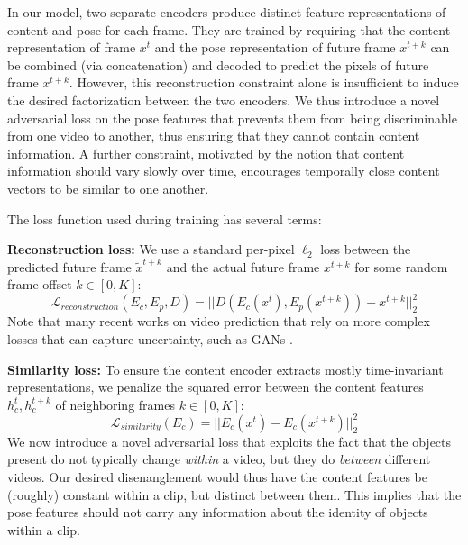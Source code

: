 \documentclass{article}
\begin{document}
In our model, two separate encoders produce distinct feature representations of content and pose for each frame. They are trained by requiring that the content representation of frame $x^t$ and the pose representation of future frame $x^{t+k}$ can be combined (via concatenation) and decoded to predict the pixels of future frame $x^{t+k}$. However, this reconstruction constraint alone is insufficient to induce the desired factorization between the two encoders. We thus introduce a novel adversarial loss on the pose features that prevents them from being discriminable from one video  to another, thus ensuring that they cannot contain content information. A further constraint, motivated by the notion that content information should vary slowly over time, encourages temporally close content vectors to be similar to one another.


The loss function used during training has several terms:

\textbf{Reconstruction loss:}
We use a standard per-pixel $\ell_2$ loss between the predicted future frame $\tilde{x}^{t+k}$ and the actual future frame $x^{t+k}$ for some random frame offset $k \in [0,K]$:
\begin{equation}
    \mathcal{L}_{reconstruction}(E_c, E_p, D) =  ||D(E_c(x^t), E_p(x^{t+k})) - x^{t+k}||^2_2
\end{equation}
Note that many recent works on video prediction that rely on more complex losses that can capture uncertainty, such as GANs \cite{mathieu2016, goodfellow2014}.

\textbf{Similarity loss:}%
To ensure the content encoder extracts mostly time-invariant representations, we penalize the squared error between the content features $h_c^t, h_c^{t+k}$ of neighboring frames $k \in [0,K]$:
\begin{equation}
    \mathcal{L}_{similarity}(E_c) =  ||E_c(x^t) - E_c(x^{t+k}) ||^2_2
\end{equation}%
We now introduce a novel adversarial loss that exploits the fact that the objects present do not typically change {\em within} a video, but they do {\em between} different videos. Our desired disenanglement would thus have the content features be (roughly) constant within a clip, but distinct between them. This implies that the pose features should not carry any information about the identity of objects within a clip.
\end{document}

